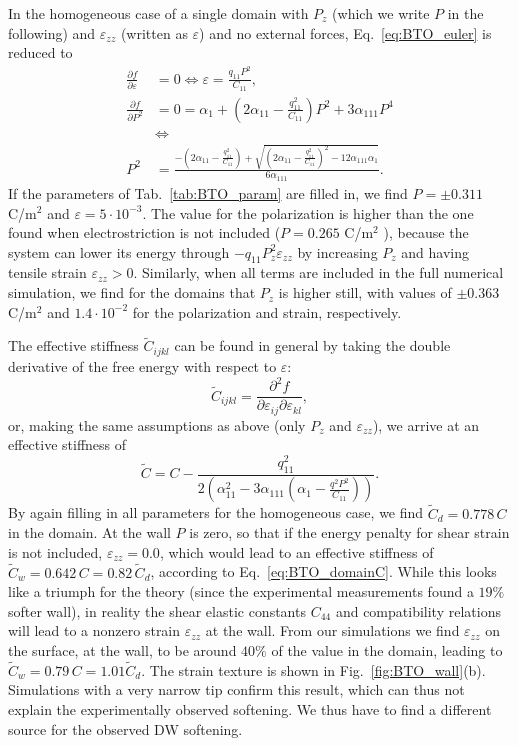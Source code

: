 In the homogeneous case of a single domain with $P_z$ (which we write $P$ in the following) and $\varepsilon_{zz}$ (written as $\varepsilon$) and no external forces, Eq.~\ref{eq:BTO_euler} is reduced to  
\begin{align}
	\frac{\partial f}{\partial \varepsilon} &= 0 \Leftrightarrow \varepsilon = \frac{q_{11}P^2}{C_{11}}\label{eq:BTO_e0},\\
	\frac{\partial f}{\partial P^2} &= 0 = \alpha_1 + (2 \alpha_{11} - \frac{q_{11}^2}{C_{11}})P^2 + 3\alpha_{111}P^4 \\
	& \Leftrightarrow \\
	P^2 &= \frac{-(2\alpha_{11} - \frac{q_{11}^2}{C_{11}}) + \sqrt{(2\alpha_{11}-\frac{q_{11}^2}{C_{11}})^2 - 12 \alpha_{111} \alpha_1}}{6\alpha_{111}}.
\end{align}
If the parameters of Tab.~\ref{tab:BTO_param} are filled in, we find $P = \pm 0.311$ C/m$^2$ and $\varepsilon = 5 \cdot 10^{-3}$.
The value for the polarization is higher than the one found when electrostriction is not included ($P = 0.265$ C/m$^2$ \cite{Marton2010}), because the system can lower its energy through $-q_{11}P_z^2\varepsilon_{zz}$ by increasing $P_z$ and having tensile strain $\varepsilon_{zz} > 0$.
Similarly, when all terms are included in the full numerical simulation, we find for the domains that $P_z$ is higher still, with values of $\pm 0.363$ C/m$^2$ and $1.4 \cdot 10^{-2}$ for the polarization and strain, respectively.

The effective stiffness $\tilde{C}_{ijkl}$ can be found in general by taking the double derivative of the free energy with respect to $\varepsilon$:
\begin{equation}
	\tilde{C}_{ijkl} = \frac{\partial^2 f}{\partial \varepsilon_{ij} \partial \varepsilon_{kl}},
\end{equation}
or, making the same assumptions as above (only $P_z$ and $\varepsilon_{zz}$), we arrive at an effective stiffness of
\begin{equation}
	\tilde{C} = C - \frac{q_{11}^2}{2\left(\alpha_{11}^2 - 3 \alpha_{111}\left(\alpha_1  - \frac{q^2 P^2}{C_{11}}\right)\right)}\label{eq:BTO_domainC}.
\end{equation}
By again filling in all parameters for the homogeneous case, we find $\tilde{C}_d = 0.778 \,C$ in the domain.
At the wall $P$ is zero, so that if the energy penalty for shear strain is not included, $\varepsilon_{zz} = 0.0$, which would lead to an effective stiffness of $\tilde{C}_w = 0.642 \, C = 0.82\, \tilde{C}_d$, according to Eq.~\ref{eq:BTO_domainC}.
While this looks like a triumph for the theory (since the experimental measurements found a $19\%$ softer wall), in reality the shear elastic constants $C_{44}$ and compatibility relations will lead to a nonzero strain $\varepsilon_{zz}$ at the wall.
From our simulations we find $\varepsilon_{zz}$ on the surface, at the wall, to be around $40\%$ of the value in the domain, leading to $\tilde{C}_w = 0.79 \, C = 1.01 \tilde{C}_d$.
The strain texture is shown in Fig.~\ref{fig:BTO_wall}(b).
Simulations with a very narrow tip confirm this result, which can thus not explain the experimentally observed softening.
We thus have to find a different source for the observed DW softening.

